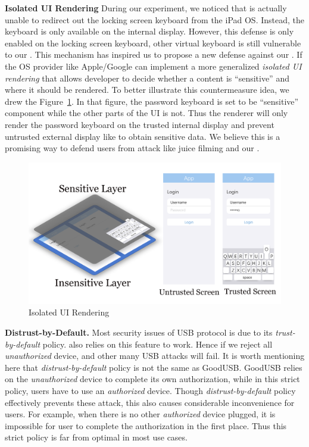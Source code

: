 \textbf{Isolated UI Rendering}
During our experiment, we noticed that \tool is actually unable to redirect out the locking screen keyboard from the iPad OS. Instead, the keyboard is only available on the internal display. However, this defense is only enabled on the locking screen keyboard, other virtual keyboard is still vulnerable to our \tool. This mechanism has inspired us to propose a new defense against our \tool. If the OS provider like Apple/Google can implement a more generalized \emph{isolated UI rendering} that allows developer to decide whether a content is ``sensitive'' and where it should be rendered. To better illustrate this countermeasure idea, we drew the Figure~\ref{fig:isolated_ui}. In that figure, the password keyboard is set to be ``sensitive'' component while the other parts of the UI is not. Thus the renderer will only render the password keyboard on the trusted internal display and prevent untrusted external display like \tool to obtain sensitive data. We believe this is a promising way to defend users from attack like juice filming and our \tool.
\begin{figure}[htbp]
	\includegraphics[width=\linewidth]{./Figs/isolated_ui.png}
	\caption{Isolated UI Rendering}
	\label{fig:isolated_ui}
\end{figure}

\textbf{Distrust-by-Default.}
Most security issues of USB protocol is due to its \textit{trust-by-default} policy. \tool also relies on this feature to work. Hence if we reject all \textit{unauthorized} device, \tool and other many USB attacks will fail. It is worth mentioning here that \textit{distrust-by-default} policy is not the same as GoodUSB\cite{tian2015defending}. GoodUSB relies on the \textit{unauthorized} device to complete its own authorization, while in this strict policy, users have to use an \textit{authorized} device. Though \textit{distrust-by-default} policy effectively prevents these attack, this also causes considerable inconvenience for users. For example, when there is no other \textit{authorized} device plugged, it is impossible for user to complete the authorization in the first place. Thus this strict policy is far from optimal in most use cases.